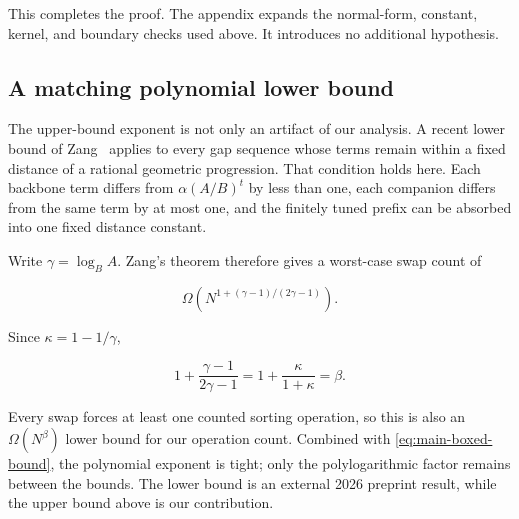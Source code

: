 This completes the proof.  The appendix expands the normal-form, constant,
kernel, and boundary checks used above.  It introduces no additional
hypothesis.\par

\subsection{A matching polynomial lower bound}

The upper-bound exponent is not only an artifact of our analysis.  A recent
lower bound of Zang~\cite[Theorem~3]{zang2026} applies to every gap sequence
whose terms remain within a fixed distance of a rational geometric progression.
That condition holds here.  Each backbone term differs from
$\alpha(A/B)^t$ by less than one, each companion differs from the same term by
at most one, and the finitely tuned prefix can be absorbed into one fixed
distance constant.

Write $\gamma=\log_B A$.  Zang's theorem therefore gives a worst-case swap
count of

\begin{equation}
  \Omega\!\left(
    N^{1+(\gamma-1)/(2\gamma-1)}
  \right).
  \label{eq:main-matching-lower}
\end{equation}

Since $\kappa=1-1/\gamma$,

\[
  1+\frac{\gamma-1}{2\gamma-1}
  =1+\frac{\kappa}{1+\kappa}
  =\beta.
\]

Every swap forces at least one counted sorting operation, so this is also an
$\Omega(N^\beta)$ lower bound for our operation count.  Combined with
\eqref{eq:main-boxed-bound}, the polynomial exponent is tight; only the
polylogarithmic factor remains between the bounds.  The lower bound is an
external 2026 preprint result, while the upper bound above is our contribution.
